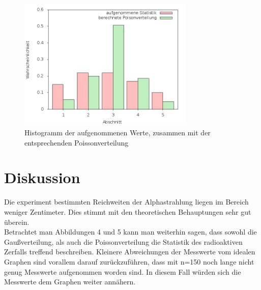 \begin{figure}[H]
\includegraphics[width=0.75\textwidth]{pics/poisson.png}
\caption{Histogramm der aufgenommenen Werte, zusammen mit der entsprechenden Poissonverteilung}
\end{figure}

\section{Diskussion}
Die experiment bestimmten Reichweiten der Alphastrahlung liegen im Bereich weniger Zentimeter. Dies stimmt mit den theoretischen Behauptungen sehr gut überein.\\

Betrachtet man Abbildungen 4 und 5 kann man weiterhin sagen, dass sowohl die Gaußverteilung, als auch die Poissonverteilung die Statistik des radioaktiven Zerfalls treffend beschreiben. Kleinere Abweichungen der Messwerte vom idealen Graphen sind vorallem darauf zurückzuführen, dass mit n=150 noch lange nicht genug Messwerte aufgenommen worden sind. In diesem Fall würden sich die Messwerte dem Graphen weiter annähern.







